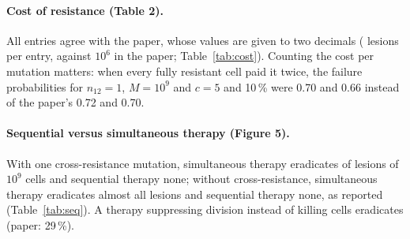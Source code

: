 \begin{table}[htbp]
\centering\scriptsize
\caption{Probability that dual therapy fails, per patient: Table~1 of \cite{bozic2013},
equation~(1) with the lesions of Supplementary file~2, and simulation.}
\label{tab:patients}

\end{table}

\paragraph{Cost of resistance (Table 2).} All \BozicCostConsistent{} entries agree with the
paper, whose values are given to two decimals (\BozicCostLesions{} lesions per entry, against
$10^6$ in the paper; Table~\ref{tab:cost}). Counting the cost per mutation matters: when every
fully resistant cell paid it twice, the failure probabilities for $n_{12}=1$, $M=10^9$ and
$c=5$ and 10\,\% were 0.70 and 0.66 instead of the paper's 0.72 and 0.70.

\begin{table}[htbp]
\centering\small
\caption{Probability of treatment failure with a cost of resistance $c$ per mutation:
simulation (Table~2 of \cite{bozic2013} in parentheses).}
\label{tab:cost}

\end{table}

\paragraph{Sequential versus simultaneous therapy (Figure 5).} With one cross-resistance
mutation, simultaneous therapy eradicates \BozicSimulOneCross{} of lesions of $10^9$ cells and
sequential therapy none; without cross-resistance, simultaneous therapy eradicates almost all
lesions and sequential therapy none, as reported (Table~\ref{tab:seq}). A therapy suppressing
division instead of killing cells eradicates \BozicSuppress{} (paper: 29\,\%).

\begin{table}[htbp]
\centering\small
\caption{Sequential and simultaneous dual therapy, $M=10^9$ (\BozicSeqLesions{} lesions each).}
\label{tab:seq}

\end{table}


